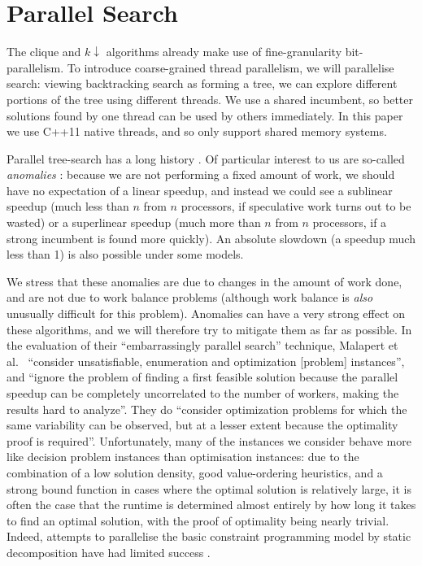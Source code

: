 \documentclass{llncs}
\begin{document}
\section{Parallel Search}

The clique and $k{\downarrow}$ algorithms already make use of fine-granularity bit-parallelism. To
introduce coarse-grained thread parallelism, we will parallelise search: viewing backtracking search
as forming a tree, we can explore different portions of the tree using different threads. We use a
shared incumbent, so better solutions found by one thread can be used by others immediately. In this
paper we use C++11 native threads, and so only support shared memory systems.

Parallel tree-search has a long history \cite{o:BaderHC05}. Of particular interest to us are
so-called \emph{anomalies}
\cite{DBLP:journals/cacm/LaiS84,DBLP:journals/tc/LiW86,DBLP:conf/irregular/BruinKT95}: because we
are not performing a fixed amount of work, we should have no expectation of a linear speedup, and
instead we could see a sublinear speedup (much less than $n$ from $n$ processors, if speculative
work turns out to be wasted) or a superlinear speedup (much more than $n$ from $n$ processors, if a
strong incumbent is found more quickly). An absolute slowdown (a speedup much less than 1) is also
possible under some models.

We stress that these anomalies are due to changes in the amount of work done, and are not due to
work balance problems (although work balance is \emph{also} unusually difficult for this problem).
Anomalies can have a very strong effect on these algorithms, and we will therefore try to mitigate
them as far as possible. In the evaluation of their ``embarrassingly parallel search'' technique,
Malapert et al.\ \cite{DBLP:journals/jair/MalapertRR16} ``consider unsatisfiable, enumeration and
optimization [problem] instances'', and ``ignore the problem of finding a first feasible solution
because the parallel speedup can be completely uncorrelated to the number of workers, making the
results hard to analyze''. They do ``consider optimization problems for which the same variability
can be observed, but at a lesser extent because the optimality proof is required''. Unfortunately,
many of the instances we consider behave more like decision problem instances than optimisation
instances: due to the combination of a low solution density, good value-ordering heuristics, and a
strong bound function in cases where the optimal solution is relatively large, it is often the case
that the runtime is determined almost entirely by how long it takes to find an optimal solution,
with the proof of optimality being nearly trivial.  Indeed, attempts to parallelise the basic
constraint programming model by static decomposition have had limited success
\cite{DBLP:conf/ictai/MinotNS15}.
\end{document}
